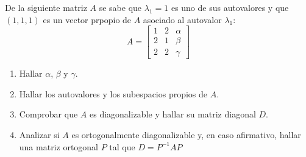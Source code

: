 \begin{enunciado}
 De la siguiente matriz $A$ se sabe que $\lambda_1 = 1$ es uno de sus autovalores y que $(1,1,1)$ es un vector prpopio de $A$ asociado al autovalor $\lambda_1$:
 \begin{equation*}
  A = 
  \begin{bmatrix}
   1 & 2 & \alpha \\
   2 & 1 & \beta  \\
   2 & 2 & \gamma
  \end{bmatrix}
 \end{equation*}
 \begin{enumerate}[$a$)]
  \item Hallar $\alpha$, $\beta$ y $\gamma$.
  
  \item Hallar los autovalores y los subespacios propios de $A$.
  
  \item Comprobar que $A$ es diagonalizable y hallar su matriz diagonal $D$.
  
  \item Analizar si $A$ es ortogonalmente diagonalizable y, en caso afirmativo, hallar una matriz ortogonal $P$ tal que $D = P^{-1}AP$
 \end{enumerate}
\end{enunciado}
 
